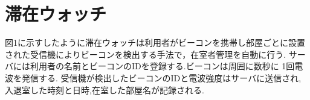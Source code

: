 
\section{滞在ウォッチ}
\label{sec:const}
図1に示すしたように滞在ウォッチは利用者がビーコンを携帯し部屋ごとに設置された受信機によりビーコンを検出する手法で，在室者管理を自動に行う.
サーバには利用者の名前とビーコンのIDを登録する.ビーコンは周囲に数秒に 1回電波を発信する.
受信機が検出したビーコンのIDと電波強度はサーバに送信され,入退室した時刻と日時,在室した部屋名が記録される.